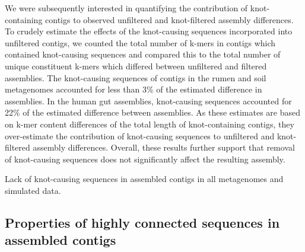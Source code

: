 \documentclass[11pt]{article} %
\begin{document}
We were subsequently interested in quantifying the contribution of knot-containing contigs to observed unfiltered and knot-filtered assembly differences.  To crudely estimate the effects of the knot-causing sequences incorporated into unfiltered contigs, we counted the total number of k-mers in contigs which contained knot-causing sequences and compared this to the total number of unique constituent k-mers which differed between unfiltered and filtered assemblies.  The knot-causing sequences of contigs in the rumen and soil metagenomes accounted for less than  3\% of the estimated difference in assemblies.  In the human gut assemblies, knot-causing sequences accounted for 22\% of the estimated difference between assemblies.  As these estimates are based on k-mer content differences of the total length of knot-containing contigs, they over-estimate the contribution of knot-causing sequences to unfiltered and knot-filtered assembly differences.   Overall, these results further support that removal of knot-causing sequences does not significantly affect the resulting assembly.


\begin{table}
\caption{Lack of knot-causing sequences in assembled contigs in all metagenomes and simulated data.}
\end{table}


\subsection{Properties of highly connected sequences in assembled contigs}
\end{document}

